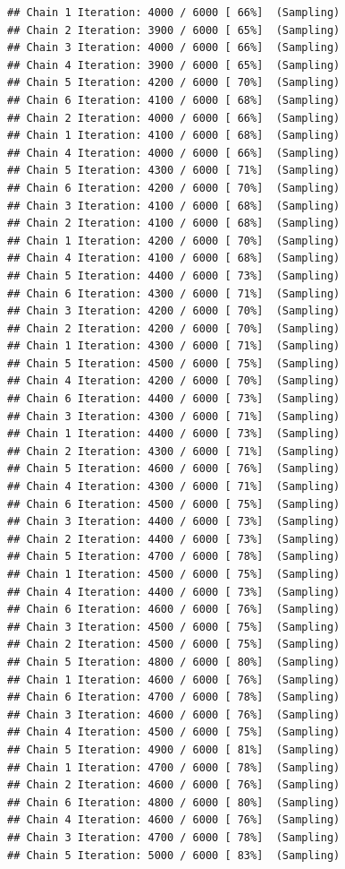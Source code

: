 \documentclass[
]{article}
\begin{document}
\begin{verbatim}
## Chain 1 Iteration: 4000 / 6000 [ 66%]  (Sampling) 
## Chain 2 Iteration: 3900 / 6000 [ 65%]  (Sampling) 
## Chain 3 Iteration: 4000 / 6000 [ 66%]  (Sampling) 
## Chain 4 Iteration: 3900 / 6000 [ 65%]  (Sampling) 
## Chain 5 Iteration: 4200 / 6000 [ 70%]  (Sampling) 
## Chain 6 Iteration: 4100 / 6000 [ 68%]  (Sampling) 
## Chain 2 Iteration: 4000 / 6000 [ 66%]  (Sampling) 
## Chain 1 Iteration: 4100 / 6000 [ 68%]  (Sampling) 
## Chain 4 Iteration: 4000 / 6000 [ 66%]  (Sampling) 
## Chain 5 Iteration: 4300 / 6000 [ 71%]  (Sampling) 
## Chain 6 Iteration: 4200 / 6000 [ 70%]  (Sampling) 
## Chain 3 Iteration: 4100 / 6000 [ 68%]  (Sampling) 
## Chain 2 Iteration: 4100 / 6000 [ 68%]  (Sampling) 
## Chain 1 Iteration: 4200 / 6000 [ 70%]  (Sampling) 
## Chain 4 Iteration: 4100 / 6000 [ 68%]  (Sampling) 
## Chain 5 Iteration: 4400 / 6000 [ 73%]  (Sampling) 
## Chain 6 Iteration: 4300 / 6000 [ 71%]  (Sampling) 
## Chain 3 Iteration: 4200 / 6000 [ 70%]  (Sampling) 
## Chain 2 Iteration: 4200 / 6000 [ 70%]  (Sampling) 
## Chain 1 Iteration: 4300 / 6000 [ 71%]  (Sampling) 
## Chain 5 Iteration: 4500 / 6000 [ 75%]  (Sampling) 
## Chain 4 Iteration: 4200 / 6000 [ 70%]  (Sampling) 
## Chain 6 Iteration: 4400 / 6000 [ 73%]  (Sampling) 
## Chain 3 Iteration: 4300 / 6000 [ 71%]  (Sampling) 
## Chain 1 Iteration: 4400 / 6000 [ 73%]  (Sampling) 
## Chain 2 Iteration: 4300 / 6000 [ 71%]  (Sampling) 
## Chain 5 Iteration: 4600 / 6000 [ 76%]  (Sampling) 
## Chain 4 Iteration: 4300 / 6000 [ 71%]  (Sampling) 
## Chain 6 Iteration: 4500 / 6000 [ 75%]  (Sampling) 
## Chain 3 Iteration: 4400 / 6000 [ 73%]  (Sampling) 
## Chain 2 Iteration: 4400 / 6000 [ 73%]  (Sampling) 
## Chain 5 Iteration: 4700 / 6000 [ 78%]  (Sampling) 
## Chain 1 Iteration: 4500 / 6000 [ 75%]  (Sampling) 
## Chain 4 Iteration: 4400 / 6000 [ 73%]  (Sampling) 
## Chain 6 Iteration: 4600 / 6000 [ 76%]  (Sampling) 
## Chain 3 Iteration: 4500 / 6000 [ 75%]  (Sampling) 
## Chain 2 Iteration: 4500 / 6000 [ 75%]  (Sampling) 
## Chain 5 Iteration: 4800 / 6000 [ 80%]  (Sampling) 
## Chain 1 Iteration: 4600 / 6000 [ 76%]  (Sampling) 
## Chain 6 Iteration: 4700 / 6000 [ 78%]  (Sampling) 
## Chain 3 Iteration: 4600 / 6000 [ 76%]  (Sampling) 
## Chain 4 Iteration: 4500 / 6000 [ 75%]  (Sampling) 
## Chain 5 Iteration: 4900 / 6000 [ 81%]  (Sampling) 
## Chain 1 Iteration: 4700 / 6000 [ 78%]  (Sampling) 
## Chain 2 Iteration: 4600 / 6000 [ 76%]  (Sampling) 
## Chain 6 Iteration: 4800 / 6000 [ 80%]  (Sampling) 
## Chain 4 Iteration: 4600 / 6000 [ 76%]  (Sampling) 
## Chain 3 Iteration: 4700 / 6000 [ 78%]  (Sampling) 
## Chain 5 Iteration: 5000 / 6000 [ 83%]  (Sampling) 

\end{verbatim}
\end{document}
